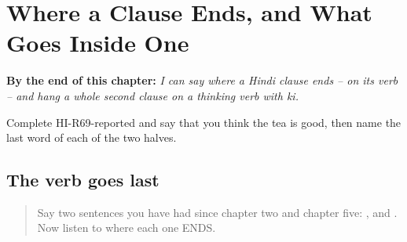 
\chapter{Where a Clause Ends, and What Goes Inside One}
\label{ch:hi-clause-as-object}

\begin{chapteropening}
\textbf{By the end of this chapter:} \emph{I can say where a Hindi clause ends -- on its verb -- and hang a whole second clause on a thinking verb with ki.}

Complete HI-R69-reported and say that you think the tea is good, then name the last word of each of the two halves.
\end{chapteropening}

\section[\texorpdfstring{… \hi{क्रिया} \hi{अंत} \hi{में} (kriyā ant meṁ)}{… क्रिया अंत में (kriyā ant meṁ)}]{The verb goes last}

\label{lesson:HI-C69-verb-last}



\begin{quote}
Say two sentences you have had since chapter two and chapter five: \textbf{   }, and \textbf{   }. Now listen to where each one ENDS.
\end{quote}

